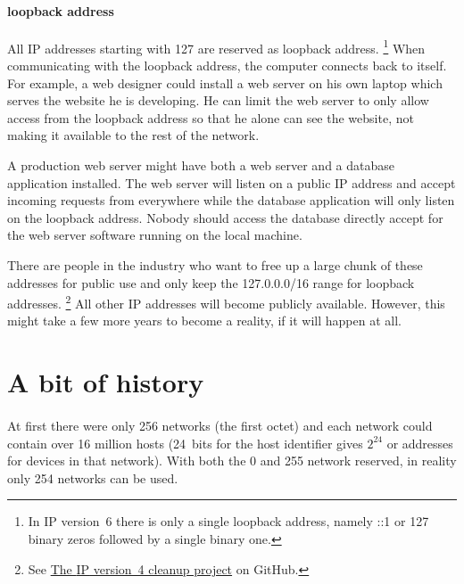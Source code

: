 \paragraph{loopback address}
All \acs{IP} addresses starting with 127 are reserved as loopback address.%
   \footnote{In \acs{IP} version~6 there is only a single loopback address, namely ::1 or 127 binary zeros followed by a single binary one.}
When communicating with the loopback address, the computer connects back to itself.
For example, a web designer could install a web server on his own laptop which serves the website he is developing.
He can limit the web server to only allow access from the loopback address so that he alone can see the website, not making it available to the rest of the network.

A production web server might have both a web server and a database application installed.
The web server will listen on a public \acs{IP} address and accept incoming requests from everywhere while the database application will only listen on the loopback address.
Nobody should access the database directly accept for the web server software running on the local machine.

There are people in the industry who want to free up a large chunk of these addresses for public use and only keep the 127.0.0.0/16 range for loopback addresses.%
\footnote{See \href{https://github.com/schoen/unicast-extensions}{The \acs{IP} version~4 cleanup project} on GitHub.}
All other \acs{IP} addresses will become publicly available.
However, this might take a few more years to become a reality, if it will happen at all.

\section{A bit of history}
\label{sec:ip-history}

\paragraph[1980]{}
At first there were only 256 networks (the first octet) and each network could contain over 16 million hosts (24~bits for the host identifier gives $2^{24}$ or  addresses for devices in that network).
With both the 0 and 255 network reserved, in reality only 254 networks can be used.

